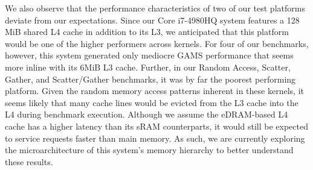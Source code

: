 We also observe that the performance characteristics of two of our test platforms deviate from our expectations.
Since our Core i7-4980HQ system features a 128 MiB shared L4 cache in addition to its L3, we anticipated that this platform would be one of the higher performers across kernels.
For four of our benchmarks, however, this system generated only mediocre GAMS performance that seems more inline with its 6MiB L3 cache.
Further, in our Random Access, Scatter, Gather, and Scatter/Gather benchmarks, it was by far the poorest performing platform.
Given the random memory access patterns inherent in these kernels, it seems likely that many cache lines would be evicted from the L3 cache into the L4 during benchmark execution.
Although we assume the eDRAM-based L4 cache has a higher latency than its sRAM counterparts, it would still be expected to service requests faster than main memory.
As such, we are currently exploring the microarchitecture of this system's memory hierarchy to better understand these results.

